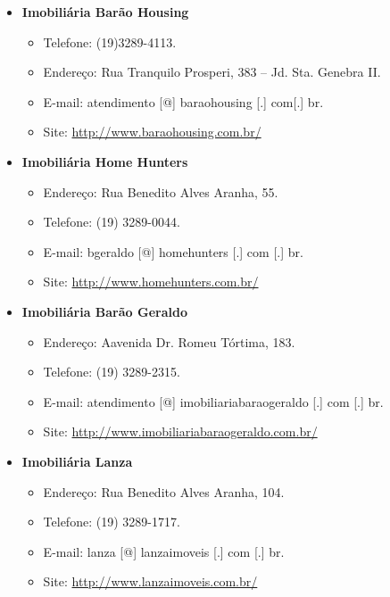 \begin{itemize}
\item  \textbf{Imobiliária Barão Housing}
\begin{itemize}
\item  Telefone: (19)3289-4113.
\item  Endereço: Rua Tranquilo Prosperi, 383 -- Jd. Sta. Genebra II.
\item  E-mail: atendimento [@] baraohousing [.] com[.] br.
\item  Site: \url{http://www.baraohousing.com.br/}
\end{itemize}
\end{itemize}

\begin{itemize}
\item  \textbf{Imobiliária Home Hunters}
\begin{itemize}
\item  Endereço: Rua Benedito Alves Aranha, 55.
\item  Telefone: (19) 3289-0044.
\item  E-mail: bgeraldo [@] homehunters [.] com [.] br.
\item  Site: \url{http://www.homehunters.com.br/}
\end{itemize}
\end{itemize}

\begin{itemize}
\item  \textbf{Imobiliária Barão Geraldo}
\begin{itemize}
\item  Endereço: Aavenida Dr. Romeu Tórtima, 183.
\item  Telefone: (19) 3289-2315.
\item  E-mail: atendimento [@] imobiliariabaraogeraldo [.] com [.] br.
\item  Site: \url{http://www.imobiliariabaraogeraldo.com.br/}
\end{itemize}
\end{itemize}

\begin{itemize}
\item  \textbf{Imobiliária Lanza}
\begin{itemize}
\item  Endereço: Rua Benedito Alves Aranha, 104.
\item  Telefone: (19) 3289-1717.
\item  E-mail: lanza [@] lanzaimoveis [.] com [.] br.
\item  Site: \url{http://www.lanzaimoveis.com.br/}
\end{itemize}
\end{itemize}

